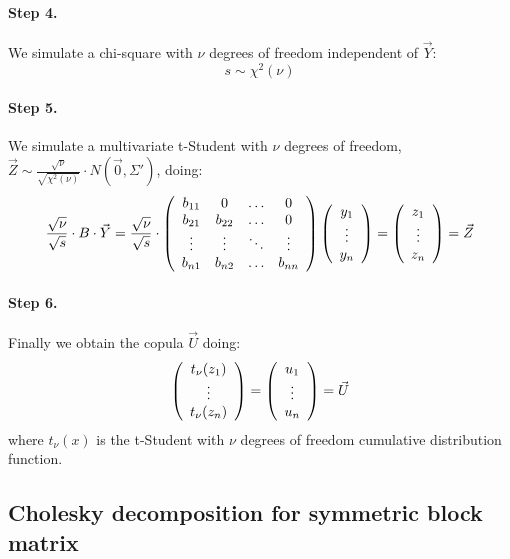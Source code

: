 \documentclass[a4paper,12pt,final]{article}
\begin{document}
\paragraph{Step 4.} We simulate a chi-square with $\nu$ degrees of freedom 
independent of $\vec{Y}$:
\begin{displaymath}
s \sim \chi^2(\nu)
\end{displaymath}

\paragraph{Step 5.} We simulate a multivariate t-Student with $\nu$ degrees of freedom, 
$\vec{Z} \sim \frac{\sqrt{\nu}}{\sqrt{\chi^2(\nu)}} \cdot N(\vec{0}, \Sigma')$, doing:
\begin{displaymath}
\frac{\sqrt{\nu}}{\sqrt{s}} \cdot B \cdot \vec{Y} 
=
\frac{\sqrt{\nu}}{\sqrt{s}} \cdot 
\left(
\begin{array}{cccc}
b_{11}   & 0        & \ldots & 0       \cr
b_{21}   & b_{22}   & \ldots & 0       \cr
\vdots  & \vdots  & \ddots & \vdots \cr
b_{n1}   & b_{n2}   & \ldots & b_{nn}
\end{array}
\right)
\left(
\begin{array}{c}
y_1 \cr
\vdots \cr
y_n
\end{array}
\right) 
=
\left(
\begin{array}{c}
z_1 \cr
\vdots \cr
z_n
\end{array}
\right) 
= 
\vec{Z}
\end{displaymath}

\paragraph{Step 6.} Finally we obtain the copula $\vec{U}$ doing:
\begin{displaymath}
\left(
\begin{array}{c}
t_\nu(z_1) \cr
\vdots \cr
t_\nu(z_n)
\end{array}
\right) 
=
\left(
\begin{array}{c}
u_1 \cr
\vdots \cr
u_n
\end{array}
\right) 
=
\vec{U} 
\end{displaymath}
where $t_\nu(x)$ is the t-Student with $\nu$ degrees of freedom cumulative distribution 
function.

\subsection{Cholesky decomposition for symmetric block matrix}
\label{ap:cholblock}
\end{document}
